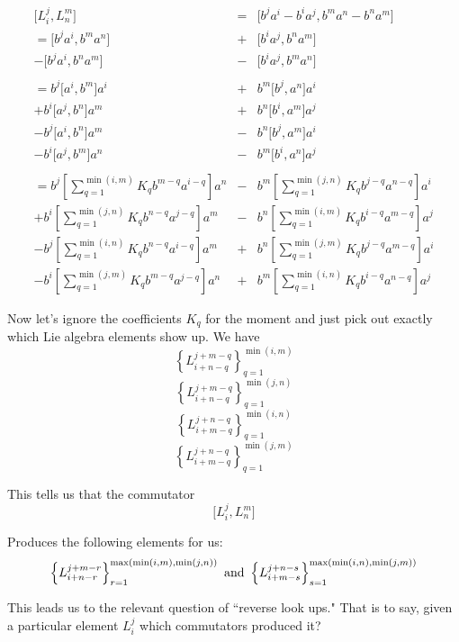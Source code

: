 \documentclass{article}
\newcommand{\lrbrack}[2]{\lbrack #1 , #2 \rbrack}
\begin{document}
\begin{eqnarray}
\lrbrack{L_i^j}{L_n^m} & = & \lrbrack{b^ja^i-b^ia^j}{b^ma^n-b^na^m} \\
= \lrbrack{b^j a^i }{b^m a^n} & + & \lrbrack{b^i a^j }{b^n a^m} \nonumber\\
-\lrbrack{b^j a^i }{b^n a^m} & - & \lrbrack{b^i a^j }{b^m a^n} \nonumber \\
 & & \nonumber\\
= b^j \lrbrack{ a^i }{b^m} a^i &+& b^m\lrbrack{b^j  }{ a^n} a^i \nonumber\\ 
+ b^i \lrbrack{ a^j }{b^n} a^m &+& b^n\lrbrack{b^i  }{ a^m} a^j \nonumber\\
- b^j \lrbrack{ a^i }{b^n} a^m &-& b^n\lrbrack{b^j  }{ a^m} a^i \nonumber\\
-b^i\lrbrack{ a^j }{b^m} a^n &-& b^m\lrbrack{b^i  }{ a^n} a^j \nonumber\\ 
& & \nonumber\\
= b^j [\sum_{q=1}^{\min(i,m)}K_q b^{m-q}a^{i-q}]a^n & - & b^m [\sum_{q=1}^{\min(j,n)}K_q b^{j-q}a^{n-q}]a^i  \nonumber \\
+ b^i [\sum_{q=1}^{\min(j,n)}K_q b^{n-q}a^{j-q}]a^m & - & b^n [\sum_{q=1}^{\min(i,m)}K_q b^{i-q}a^{m-q}]a^j \nonumber\\
- b^j [\sum_{q=1}^{\min(i,n)}K_q b^{n-q}a^{i-q}]a^m &+& b^n [\sum_{q=1}^{\min(j,m)}K_q b^{j-q}a^{m-q}]a^i \nonumber\\
- b^i [\sum_{q=1}^{\min(j,m)}K_q b^{m-q}a^{j-q}]a^n & + & b^m [\sum_{q=1}^{\min(i,n)}K_q b^{i-q}a^{n-q}]a^j\nonumber
\end{eqnarray}


Now let's ignore the coefficients $K_q$ for the moment and just pick out exactly which Lie algebra elements show up.  We have
\[
\left\{L_{i+n-q}^{j+m-q} \right\}_{q=1}^{\min(i,m)}
\]
\[
\left\{L_{i+n-q}^{j+m-q} \right\}_{q=1}^{\min(j,n)}
\]
\[
\left\{L_{i+m-q}^{j+n-q} \right\}_{q=1}^{\min(i,n)}
\]
\[
\left\{L_{i+m-q}^{j+n-q} \right\}_{q=1}^{\min(j,m)}
\]

This tells us that the commutator
\[
\lrbrack{L_i^j}{L_n^m}
\]

Produces the following elements for us:
\[
\left\{L_{i+n-r}^{j+m-r} \right\}_{r=1}^{\max(\min(i,m),\min(j,n))} \textnormal{ and } \left\{L_{i+m-s}^{j+n-s} \right\}_{s=1}^{\max(\min(i,n),\min(j,m))}
\]


This leads us to the relevant question of ``reverse look ups."  That is to say, given a particular element $L_i^j$ which commutators produced it?
\end{document}
